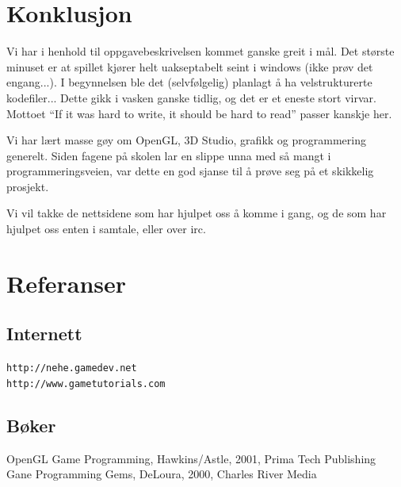 \documentclass[11pt, dvips]{report}
\begin{document}
\chapter{Konklusjon}

Vi har i henhold til oppgavebeskrivelsen kommet ganske greit i mål.
Det største minuset er at spillet kjører helt uakseptabelt seint i
windows (ikke prøv det engang...). I begynnelsen ble det
(selvfølgelig) planlagt å ha velstrukturerte kodefiler... Dette gikk i
vasken ganske tidlig, og det er et eneste stort virvar. Mottoet ``If
it was hard to write, it should be hard to read'' passer kanskje
her.

Vi har lært masse gøy om OpenGL, 3D Studio, grafikk og programmering
generelt. Siden fagene på skolen lar en slippe unna med så mangt i
programmeringsveien, var dette en god sjanse til å prøve seg på et
skikkelig prosjekt.

Vi vil takke de nettsidene som har hjulpet oss å komme i gang, og de
som har hjulpet oss enten i samtale, eller over irc.

\chapter{Referanser}

\section{Internett}

{\tt http://nehe.gamedev.net\\
http://www.gametutorials.com}

\section{Bøker}
OpenGL Game Programming, Hawkins/Astle, 2001, Prima Tech
Publishing\\[1em]
Gane Programming Gems, DeLoura, 2000, Charles River Media
\end{document}
